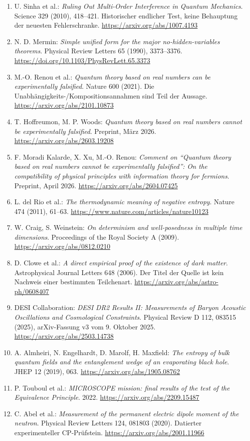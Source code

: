 \begin{enumerate}[label={F\arabic*.},leftmargin=2.5em,itemsep=7pt,before={\interlinepenalty=10000}]
\item U. Sinha et al.: \emph{Ruling Out Multi-Order Interference in Quantum Mechanics}. Science 329 (2010), 418--421. Historischer endlicher Test, keine Behauptung der neuesten Fehlerschranke. \url{https://arxiv.org/abs/1007.4193}
\item N. D. Mermin: \emph{Simple unified form for the major no-hidden-variables theorems}. Physical Review Letters 65 (1990), 3373--3376. \url{https://doi.org/10.1103/PhysRevLett.65.3373}
\item M.-O. Renou et al.: \emph{Quantum theory based on real numbers can be experimentally falsified}. Nature 600 (2021). Die Unabhängigkeits-/Kompositionsannahmen sind Teil der Aussage. \url{https://arxiv.org/abs/2101.10873}
\item T. Hoffreumon, M. P. Woods: \emph{Quantum theory based on real numbers cannot be experimentally falsified}. Preprint, März 2026. \url{https://arxiv.org/abs/2603.19208}
\item F. Moradi Kalarde, X. Xu, M.-O. Renou: \emph{Comment on ``Quantum theory based on real numbers cannot be experimentally falsified'': On the compatibility of physical principles with information theory for fermions}. Preprint, April 2026. \url{https://arxiv.org/abs/2604.07425}
\item L. del Rio et al.: \emph{The thermodynamic meaning of negative entropy}. Nature 474 (2011), 61--63. \url{https://www.nature.com/articles/nature10123}
\item W. Craig, S. Weinstein: \emph{On determinism and well-posedness in multiple time dimensions}. Proceedings of the Royal Society A (2009). \url{https://arxiv.org/abs/0812.0210}
\item D. Clowe et al.: \emph{A direct empirical proof of the existence of dark matter}. Astrophysical Journal Letters 648 (2006). Der Titel der Quelle ist kein Nachweis einer bestimmten Teilchenart. \url{https://arxiv.org/abs/astro-ph/0608407}
\item DESI Collaboration: \emph{DESI DR2 Results II: Measurements of Baryon Acoustic Oscillations and Cosmological Constraints}. Physical Review D 112, 083515 (2025), arXiv-Fassung v3 vom 9. Oktober 2025. \url{https://arxiv.org/abs/2503.14738}
\item A. Almheiri, N. Engelhardt, D. Marolf, H. Maxfield: \emph{The entropy of bulk quantum fields and the entanglement wedge of an evaporating black hole}. JHEP 12 (2019), 063. \url{https://arxiv.org/abs/1905.08762}
\item P. Touboul et al.: \emph{MICROSCOPE mission: final results of the test of the Equivalence Principle}. 2022. \url{https://arxiv.org/abs/2209.15487}
\item C. Abel et al.: \emph{Measurement of the permanent electric dipole moment of the neutron}. Physical Review Letters 124, 081803 (2020). Datierter experimenteller CP-Prüfstein. \url{https://arxiv.org/abs/2001.11966}
\end{enumerate}

